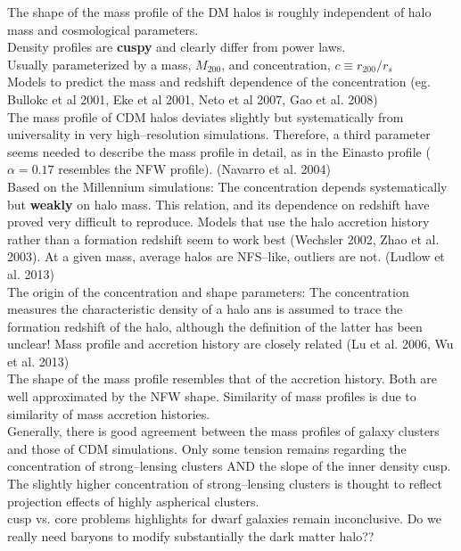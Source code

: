 \documentclass[paper=a4, fontsize=11pt]{scrartcl} %
\numberwithin{equation}{section} %
\numberwithin{figure}{section} %
\numberwithin{table}{section} %
\begin{document}
The shape of the mass profile of the DM halos is roughly independent of halo mass and cosmological parameters.\\
Density profiles are {\bf cuspy} and clearly differ from power laws.\\
Usually parameterized by a mass, $M_{200}$, and concentration, $c \equiv r_{200}/r_s$\\
Models to predict the mass and redshift dependence of the concentration (eg. Bullokc et al 2001, Eke et al 2001, Neto et al 2007, Gao et al. 2008)\\
The mass profile of CDM halos deviates slightly but systematically from universality in very high--resolution simulations. Therefore, a third parameter seems needed to describe the mass profile in detail, as in the Einasto profile ($\alpha = 0.17$ resembles the NFW profile). (Navarro et al. 2004)\\
Based on the Millennium simulations: The concentration depends systematically but {\bf weakly} on halo mass. This relation, and its dependence on redshift have proved very difficult to reproduce. Models that use the halo accretion history rather than a formation redshift seem to work best (Wechsler 2002, Zhao et al. 2003). At a given mass, average halos are NFS--like, outliers are not. (Ludlow et al. 2013)\\
The origin of the concentration and shape parameters: The concentration measures the characteristic density of a halo ans is assumed to trace the formation redshift of the halo, although the definition of the latter has been unclear! Mass profile and accretion history are closely related (Lu et al. 2006, Wu et al. 2013)\\
The shape of the mass profile resembles that of the accretion history. Both are well approximated by the NFW shape. Similarity of mass profiles is due to similarity of mass accretion histories. \\
Generally, there is good agreement between the mass profiles of galaxy clusters and those of CDM simulations. Only some tension remains regarding the concentration of strong--lensing clusters AND the slope of the inner density cusp. The slightly higher concentration of strong--lensing clusters is thought to reflect projection effects of highly aspherical clusters.\\
cusp vs. core problems highlights for dwarf galaxies remain inconclusive. Do we really need baryons to modify substantially the dark matter halo??\\
\end{document}
